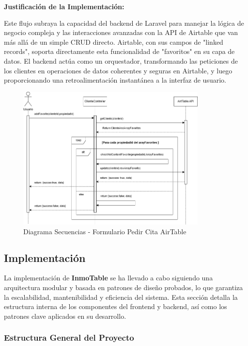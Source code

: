 \textbf{Justificación de la Implementación:}

Este flujo subraya la capacidad del backend de Laravel para manejar la lógica de negocio compleja y las interacciones avanzadas con la API de Airtable que van más allá de un simple CRUD directo. Airtable, con sus campos de "linked records", soporta directamente esta funcionalidad de "favoritos" en su capa de datos. El backend actúa como un orquestador, transformando las peticiones de los clientes en operaciones de datos coherentes y seguras en Airtable, y luego proporcionando una retroalimentación instantánea a la interfaz de usuario.

\begin{figure}[H]
    \begin{center}
        \includegraphics[width = 0.85\textwidth]{Figuras/diagramasecuenciasbotoninterespropiedad.png}
    \end{center}
    \caption{\label{fig:diagramasecuenciasbotoninterespropiedad} Diagrama Secuencias - Formulario Pedir Cita AirTable}
\end{figure}


\subsection{Implementación}

La implementación de \textbf{InmoTable} se ha llevado a cabo siguiendo una arquitectura modular y basada en patrones de diseño probados, lo que garantiza la escalabilidad, mantenibilidad y eficiencia del sistema. Esta sección detalla la estructura interna de los componentes del frontend y backend, así como los patrones clave aplicados en su desarrollo.


\subsubsection{Estructura General del Proyecto}


